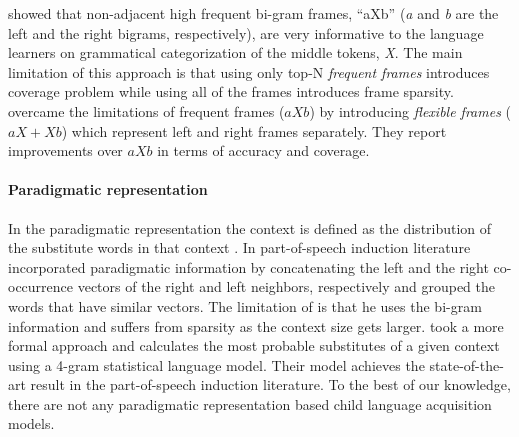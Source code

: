 \cite{Mintz200391} showed that non-adjacent high frequent bi-gram frames,
``aXb'' ({\it a} and {\it b} are the left and the right bigrams, respectively),
are very informative to the language learners on grammatical categorization of
the middle tokens, {\it X}.  The main limitation of this approach is that using
only top-N {\it frequent frames} introduces coverage problem while using all of
the frames introduces frame sparsity.  \cite{clair2010} overcame the
limitations of frequent frames ($aXb$) by introducing {\it flexible frames}
($aX+Xb$) which represent left and right frames separately.  They report
improvements over $aXb$ in terms of accuracy and coverage.  

\paragraph {Paradigmatic representation}

In the paradigmatic representation the context is defined as the distribution
of the substitute words in that context \citep*{SchutzePe93, Schutze1995,
YatbazSY12}.   In part-of-speech induction literature \cite{Schutze1995}
incorporated paradigmatic information by concatenating the left and the right
co-occurrence vectors of the right and left neighbors, respectively and grouped
the words that have similar vectors.  The limitation of \cite{Schutze1995} is
that he uses the bi-gram information and suffers from sparsity as the context
size gets larger.  \cite{YatbazSY12} took a more formal approach and
calculates the most probable substitutes of a given context using a 4-gram
statistical language model.  Their model achieves the state-of-the-art result
in the part-of-speech induction literature.  To the best of our knowledge,
there are not any paradigmatic representation based child language acquisition
models.  


